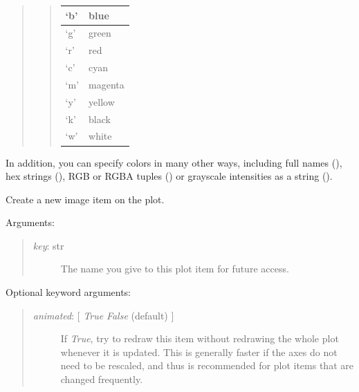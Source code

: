 \documentclass[letterpaper,10pt,english]{sphinxmanual}
\begin{document}
\begin{fulllineitems}
\begin{fulllineitems}
\begin{quote}
\begin{quote}
\begin{tabulary}{\linewidth}{|L|L|}
`b'
 & 
blue
\\\hline

`g'
 & 
green
\\\hline

`r'
 & 
red
\\\hline

`c'
 & 
cyan
\\\hline

`m'
 & 
magenta
\\\hline

`y'
 & 
yellow
\\\hline

`k'
 & 
black
\\\hline

`w'
 & 
white
\\\hline
\end{tabulary}

\end{quote}
\end{quote}

In addition, you can specify colors in many other ways, including 
full names (), hex strings (), RGB or 
RGBA tuples () or grayscale intensities as a string ().

\end{fulllineitems}


\begin{fulllineitems}
\label{api:mpl.Plot2D.new_image}
Create a new image item on the plot.

Arguments:
\begin{quote}
\begin{description}
\item[{\emph{key}: str}] \leavevmode
The name you give to this plot item for future access.

\end{description}
\end{quote}

Optional keyword arguments:
\begin{quote}
\begin{description}
\item[{\emph{animated}: {[} \emph{True} \textbar{} \emph{False} (default) {]}}] \leavevmode
If \emph{True}, try to redraw this item without redrawing the whole plot
whenever it is updated. This is generally faster if the axes do not
need to be rescaled, and thus is recommended for plot items that 
are changed frequently.


\end{description}
\end{quote}
\end{fulllineitems}
\end{fulllineitems}
\end{document}
